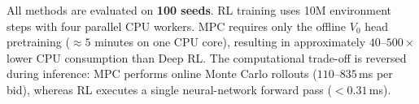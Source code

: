 \documentclass[11pt]{article}
\begin{document}
\begin{table}[H]
\vspace{0.4em}
{\footnotesize
All methods are evaluated on \textbf{100 seeds}. RL training uses 10M
environment steps with four parallel CPU workers. MPC requires only the
offline $V_0$ head pretraining ($\approx5$ minutes on one CPU core),
resulting in approximately $40$--$500\times$ lower CPU consumption than Deep RL.
The computational trade-off is reversed during inference:
MPC performs online Monte Carlo rollouts ($110$--$835$\,ms per bid),
whereas RL executes a single neural-network forward pass
($<0.31$\,ms).
}
\end{table}
\end{document}
